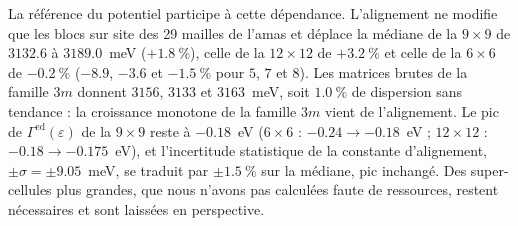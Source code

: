 La référence du potentiel participe à cette dépendance. L'alignement ne modifie que les blocs sur site des 29 mailles de l'amas et déplace la médiane de la $9\times9$ de $3132.6$ à $3189.0$~meV ($+1.8~\%$), celle de la $12\times12$ de $+3.2~\%$ et celle de la $6\times6$ de $-0.2~\%$ ($-8.9$, $-3.6$ et $-1.5~\%$ pour $5$, $7$ et $8$). Les matrices brutes de la famille $3m$ donnent $3156$, $3133$ et $3163$~meV, soit $1.0~\%$ de dispersion sans tendance : la croissance monotone de la famille $3m$ vient de l'alignement. Le pic de $\Gamma^\text{ed}(\varepsilon)$ de la $9\times9$ reste à $-0.18$~eV ($6\times6$ : $-0.24\to-0.18$~eV ; $12\times12$ : $-0.18\to-0.175$~eV), et l'incertitude statistique de la constante d'alignement, $\pm\sigma=\pm9.05$~meV, se traduit par $\pm1.5~\%$ sur la médiane, pic inchangé. Des super-cellules plus grandes, que nous n'avons pas calculées faute de ressources, restent nécessaires et sont laissées en perspective.

